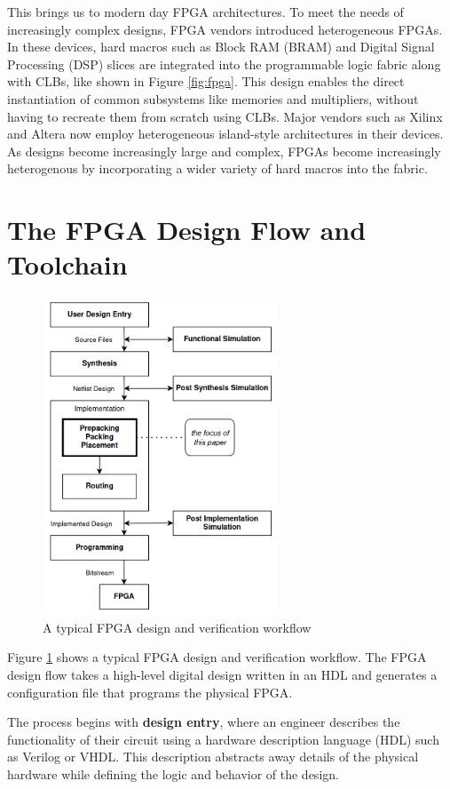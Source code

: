 \documentclass[twocolumn]{article}
\begin{document}
    This brings us to modern day FPGA architectures.
    To meet the needs of increasingly complex designs, FPGA vendors introduced heterogeneous FPGAs. 
    In these devices, hard macros such as Block RAM (BRAM) and Digital Signal Processing (DSP) slices are integrated into the programmable logic fabric along with CLBs, like shown in Figure \ref{fig:fpga}. 
    This design enables the direct instantiation of common subsystems like memories and multipliers, without having to recreate them from scratch using CLBs. 
    Major vendors such as Xilinx and Altera now employ heterogeneous island-style architectures in their devices. 
    As designs become increasingly large and complex, FPGAs become increasingly heterogenous by incorporating a wider variety of hard macros into the fabric.

\section{The FPGA Design Flow and Toolchain}
    
    \begin{figure}
        \centering
        \includegraphics[width=7.0cm]{figures/design_flow.png}
        \caption{A typical FPGA design and verification workflow}
        \label{fig:design_flow}
    \end{figure}

    Figure \ref{fig:design_flow} shows a typical FPGA design and verification workflow.
    The FPGA design flow takes a high-level digital design written in an HDL and generates a configuration file that programs the physical FPGA. 

    The process begins with \textbf{design entry}, where an engineer describes the functionality of their circuit using a hardware description language (HDL) such as Verilog or VHDL. This description abstracts away details of the physical hardware while defining the logic and behavior of the design.
\end{document}
